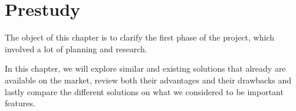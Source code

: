 \chapter{Prestudy}

The object of this chapter is to clarify the first phase of the project, which involved a lot of planning and research. 

In this chapter, we will explore similar and existing solutions that already are available on the market, review both their advantages and their drawbacks and lastly compare the different solutions on what we considered to be important features. 



\newpage





